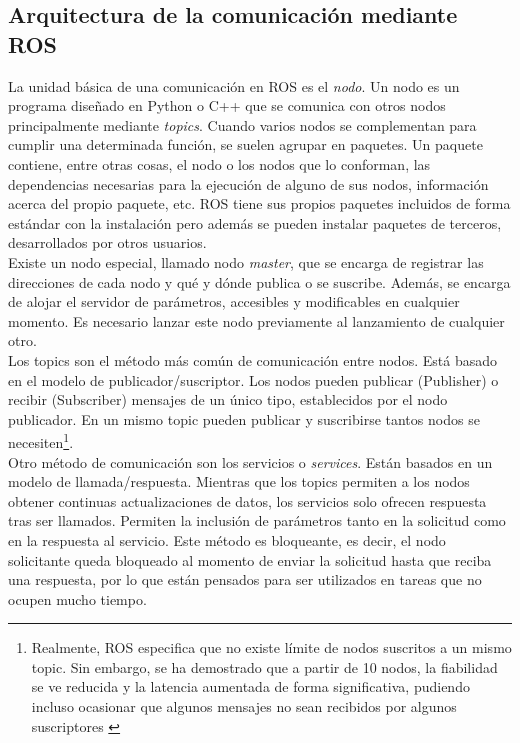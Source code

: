\subsection{Arquitectura de la comunicación mediante ROS}

La unidad básica de una comunicación en ROS es el \textit{nodo}. Un nodo es un programa diseñado en Python o C++ que se comunica con otros nodos principalmente mediante \textit{topics}. Cuando varios nodos se complementan para cumplir una determinada función, se suelen agrupar en paquetes. Un paquete contiene, entre otras cosas, el nodo o los nodos que lo conforman, las dependencias necesarias para la ejecución de alguno de sus nodos, información acerca del propio paquete, etc. ROS tiene sus propios paquetes incluidos de forma estándar con la instalación pero además se pueden instalar paquetes de terceros, desarrollados por otros usuarios.\\

Existe un nodo especial, llamado nodo \textit{master}, que se encarga de registrar las direcciones de cada nodo y qué y dónde publica o se suscribe. Además, se encarga de alojar el servidor de parámetros, accesibles y modificables en cualquier momento. Es necesario lanzar este nodo previamente al lanzamiento de cualquier otro. \\

Los topics son el método más común de comunicación entre nodos. Está basado en el modelo de publicador/suscriptor. Los nodos pueden publicar (Publisher) o recibir (Subscriber) mensajes de un único tipo, establecidos por el nodo publicador. En un mismo topic pueden publicar y suscribirse tantos nodos se necesiten\footnote{Realmente, ROS especifica que no existe límite de nodos suscritos a un mismo topic. Sin embargo, se ha demostrado que a partir de 10 nodos, la fiabilidad se ve reducida y la latencia aumentada de forma significativa, pudiendo incluso ocasionar que algunos mensajes no sean recibidos por algunos suscriptores \cite{issue}}. \\

Otro método de comunicación son los servicios o \textit{services}. Están basados en un modelo de llamada/respuesta. Mientras que los topics permiten a los nodos obtener continuas actualizaciones de datos, los servicios solo ofrecen respuesta tras ser llamados. Permiten la inclusión de parámetros tanto en la solicitud como en la respuesta al servicio. Este método es bloqueante, es decir, el nodo solicitante queda bloqueado al momento de enviar la solicitud hasta que reciba una respuesta, por lo que están pensados para ser utilizados en tareas que no ocupen mucho tiempo.\\

